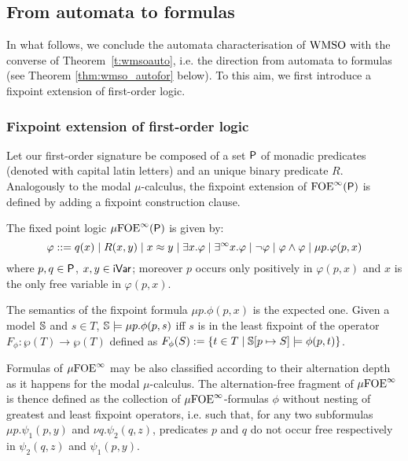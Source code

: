 \subsection{From automata to formulas}\label{sec:aut_to_form_wmso}


In what follows, we conclude the automata characterisation of $\mathrm{WMSO}$ with the converse of Theorem~\ref{t:wmsoauto}, i.e. the direction from automata to formulas (see Theorem \ref{thm:wmso_autofor} below). To this aim, we first introduce a fixpoint extension of first-order logic.

\subsubsection{Fixpoint extension of first-order logic}

Let our first-order signature be composed of a set $\mathsf{P}$ of monadic predicates (denoted with capital latin letters) and an unique binary predicate $R$. Analogously to the modal $\mu$-calculus, the fixpoint extension of ${\mathrm{FOE}}^\infty(\mathsf{P})$ is defined by adding a fixpoint construction clause.

\begin{definition}
The fixed point logic $\mu{\ensuremath{\mathrm{FOE}}}^\infty(\mathsf{P})$ is given by:
$$
\varphi ::= q(x) \mid R(x,y) \mid x \approx y \mid \exists x.\varphi \mid \exists^\infty x.\varphi \mid \lnot\varphi \mid \varphi \land \varphi \mid \mu p.\varphi(p,x)
$$
where $p,q\in\mathsf{P}$, $x,y\in\mathsf{iVar}$; moreover $p$ occurs only positively in $\varphi(p,x)$ and $x$ is the only free variable in $\varphi(p,x)$.
\end{definition}

The semantics of the fixpoint formula $\mu p. \phi(p, x)$ is the expected one. Given a model $\mathbb{S}$ and $s \in T$,  $\mathbb{S} \models \mu p. \phi(p, s)$ iff $s$ is in the least fixpoint of the  operator $F_\phi:\wp(T)\to \wp(T)$ defined as $F_\phi(S) := \{t \in T \mid \mathbb{S}[p \mapsto S] \models \phi(p, t) \}$.

Formulas of $\mu{\ensuremath{\mathrm{FOE}}}^\infty$ may be also classified according to their alternation depth as it happens for the modal $\mu$-calculus.
The alternation-free fragment of $\mu{\ensuremath{\mathrm{FOE}}}^\infty$ is thence defined as the collection of $\mu{\ensuremath{\mathrm{FOE}}}^\infty$-formulas $\phi$
without nesting of greatest and least fixpoint operators, i.e. such that, for any two subformulas $\mu p.\psi_1(p,y)$ and $\nu q. \psi_2(q,z)$, predicates $p$ and $q$ do not occur free respectively in $\psi_2(q,z)$ and $\psi_1(p,y)$.

